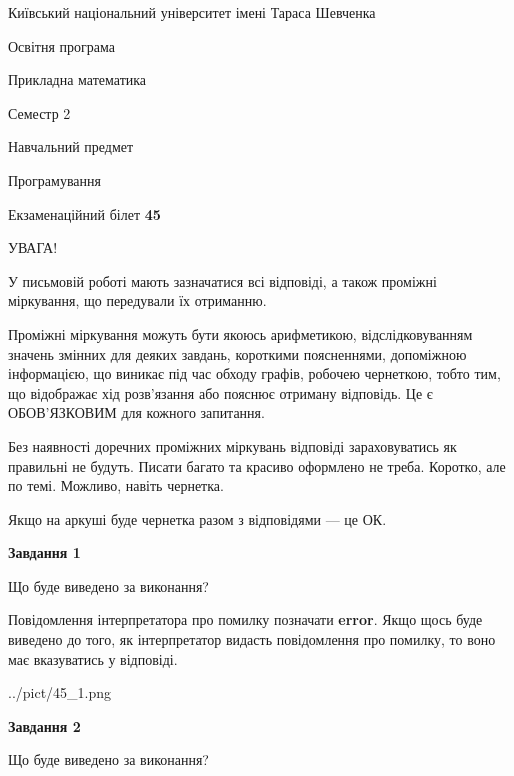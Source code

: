 \documentclass[12pt, ukrainian]{article}
\begin{document}
{{\begin {small}\par
{ \center  Київський національний університет імені Тараса Шевченка \par}
{\parbox {5 cm}{Освітня програма \hfill}{\parbox {7 cm}{Прикладна математика \hfill}}\parbox {6 cm}{\hfill Семестр 2}}\par
{\parbox {5 cm} {Навчальний предмет \hfill}\parbox {7 cm}{Програмування \hfill}\parbox {6cm}{\hfill}\par}\vspace{-7pt} \end{small}}{\center Екзаменаційний білет \No \textbf
{ 45 }\par}}
{
\begin {large}
УВАГА!

У письмовій роботі мають зазначатися всі відповіді, а також проміжні міркування, що передували їх отриманню.

Проміжні міркування можуть бути якоюсь арифметикою, відслідковуванням зна\-чень змінних для деяких завдань,
короткими поясненнями, допоміжною інформацією, що виникає під час обходу графів, робочею чернеткою,
тобто тим, що відображає хід розв’язання або пояснює отриману відповідь.
Це є ОБОВ’ЯЗКОВИМ для кожного запитання.

Без наявності доречних проміжних міркувань відповіді зараховуватись як правиль\-ні не будуть.
Писати багато та красиво оформлено не треба. Коротко, але по темі. Можли\-во, навіть чернетка.

Якщо на аркуші буде чернетка разом з відповідями --- це ОК.

\newpage

{\begin {center}\textbf{Завдання 1}\end {center}}\par
Що буде виведено за виконання?

Повідомлення інтерпретатора про помилку позначати \textbf{error}.
Якщо щось буде виведено до того, як інтерпретатор видасть повідомлення про помилку, 
то воно має вказуватись у відповіді. \par


\begin{center}
	{../pict/45_1.png}
\end{center}
\newpage

{\begin {center}\textbf{Завдання 2}\end {center}}\par
Що буде виведено за виконання?


\end{large}}
\end{document}
